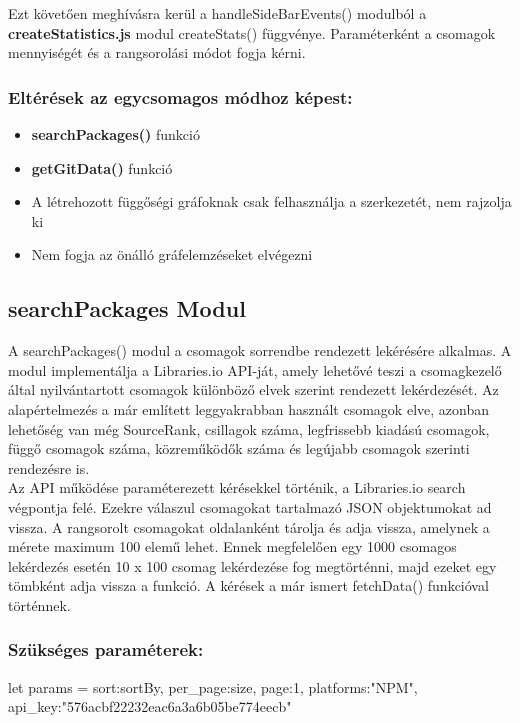 Ezt követően meghívásra kerül a handleSideBarEvents() modulból a \textbf{createStatistics.js} modul createStats() függvénye. Paraméterként a csomagok mennyiségét és a rangsorolási módot fogja kérni.

\subsubsection{Eltérések az egycsomagos módhoz képest:}

\begin{itemize}
	\item \textbf{searchPackages()} funkció
	\item \textbf{getGitData()} funkció
	\item A létrehozott függőségi gráfoknak csak felhasználja a szerkezetét, nem rajzolja ki
	\item Nem fogja az önálló gráfelemzéseket elvégezni
\end{itemize}

\subsection{searchPackages Modul}

A searchPackages() modul a csomagok sorrendbe rendezett lekérésére alkalmas. A modul implementálja a Libraries.io API-ját, amely lehetővé teszi a csomagkezelő által nyilvántartott csomagok különböző elvek szerint rendezett lekérdezését. Az alapértelmezés a már említett leggyakrabban használt csomagok elve, azonban lehetőség van még SourceRank, csillagok száma, legfrissebb kiadású csomagok, függő csomagok száma, közreműködők száma és legújabb csomagok szerinti rendezésre is.\\

Az API működése paraméterezett kérésekkel történik, a Libraries.io search végpontja felé. Ezekre válaszul csomagokat tartalmazó JSON objektumokat ad vissza. A rangsorolt csomagokat oldalanként tárolja és adja vissza, amelynek a mérete maximum 100 elemű lehet. Ennek megfelelően egy 1000 csomagos lekérdezés esetén 10 x 100 csomag lekérdezése fog megtörténni, majd ezeket egy tömbként adja vissza a funkció. A kérések a már ismert fetchData() funkcióval történnek.

\subsubsection{Szükséges paraméterek:}
\begin{cpp}
	let params = {
		sort:sortBy, 
		per_page:size,
		page:1,
		platforms:"NPM",
		api_key:"576acbf22232eac6a3a6b05be774eecb"
	}
\end{cpp}

